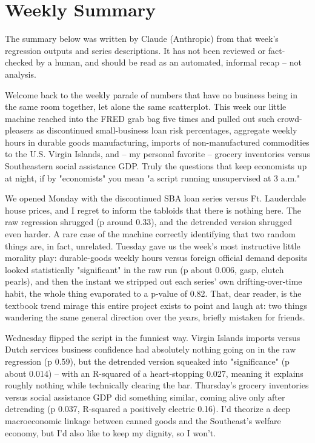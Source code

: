 \section{Weekly Summary}

\begin{tcolorbox}[colback=yellow!10,colframe=black!50,title=AI-Generated Content]
\noindent The summary below was written by Claude (Anthropic) from that week's regression outputs and series descriptions. It has not been reviewed or fact-checked by a human, and should be read as an automated, informal recap -- not analysis.
\end{tcolorbox}

Welcome back to the weekly parade of numbers that have no business being in the same room together, let alone the same scatterplot. This week our little machine reached into the FRED grab bag five times and pulled out such crowd-pleasers as discontinued small-business loan risk percentages, aggregate weekly hours in durable goods manufacturing, imports of non-manufactured commodities to the U.S. Virgin Islands, and -- my personal favorite -- grocery inventories versus Southeastern social assistance GDP. Truly the questions that keep economists up at night, if by "economists" you mean "a script running unsupervised at 3 a.m."

We opened Monday with the discontinued SBA loan series versus Ft. Lauderdale house prices, and I regret to inform the tabloids that there is nothing here. The raw regression shrugged (p around 0.33), and the detrended version shrugged even harder. A rare case of the machine correctly identifying that two random things are, in fact, unrelated. Tuesday gave us the week's most instructive little morality play: durable-goods weekly hours versus foreign official demand deposits looked statistically "significant" in the raw run (p about 0.006, gasp, clutch pearls), and then the instant we stripped out each series' own drifting-over-time habit, the whole thing evaporated to a p-value of 0.82. That, dear reader, is the textbook trend mirage this entire project exists to point and laugh at: two things wandering the same general direction over the years, briefly mistaken for friends.

Wednesday flipped the script in the funniest way. Virgin Islands imports versus Dutch services business confidence had absolutely nothing going on in the raw regression (p 0.59), but the detrended version squeaked into "significance" (p about 0.014) -- with an R-squared of a heart-stopping 0.027, meaning it explains roughly nothing while technically clearing the bar. Thursday's grocery inventories versus social assistance GDP did something similar, coming alive only after detrending (p 0.037, R-squared a positively electric 0.16). I'd theorize a deep macroeconomic linkage between canned goods and the Southeast's welfare economy, but I'd also like to keep my dignity, so I won't.

